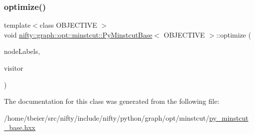 \subsubsection{\texorpdfstring{optimize()}{optimize()}}
{\footnotesize\ttfamily template$<$class O\+B\+J\+E\+C\+T\+I\+VE $>$ \\
void \hyperlink{classnifty_1_1graph_1_1opt_1_1minstcut_1_1PyMinstcutBase}{nifty\+::graph\+::opt\+::minstcut\+::\+Py\+Minstcut\+Base}$<$ O\+B\+J\+E\+C\+T\+I\+VE $>$\+::optimize (\begin{DoxyParamCaption}\item[{\hyperlink{classnifty_1_1graph_1_1opt_1_1minstcut_1_1PyMinstcutBase_a9bec148d1b9938c8bb61fc079addda6f}{Node\+Labels\+Type} \&}]{node\+Labels,  }\item[{\hyperlink{classnifty_1_1graph_1_1opt_1_1minstcut_1_1PyMinstcutBase_ab9d7b03bc4b7359bde367f0613964ede}{Visitor\+Base\+Type} $\ast$}]{visitor }\end{DoxyParamCaption})\hspace{0.3cm}{\ttfamily [inline]}}



The documentation for this class was generated from the following file\+:\begin{DoxyCompactItemize}
\item 
/home/tbeier/src/nifty/include/nifty/python/graph/opt/minstcut/\hyperlink{py__minstcut__base_8hxx}{py\+\_\+minstcut\+\_\+base.\+hxx}\end{DoxyCompactItemize}
